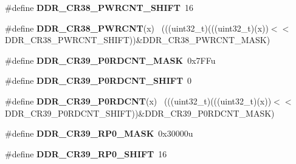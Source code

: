 \begin{DoxyCompactItemize}
\item 
\hypertarget{group___d_d_r___register___masks_gaa8b7e6d2525dfa5b54fd9377efb412c1}{}\#define {\bfseries D\+D\+R\+\_\+\+C\+R38\+\_\+\+P\+W\+R\+C\+N\+T\+\_\+\+S\+H\+I\+F\+T}~16\label{group___d_d_r___register___masks_gaa8b7e6d2525dfa5b54fd9377efb412c1}

\item 
\hypertarget{group___d_d_r___register___masks_ga0090631b8f2aa646557f6fabeb2eecf5}{}\#define {\bfseries D\+D\+R\+\_\+\+C\+R38\+\_\+\+P\+W\+R\+C\+N\+T}(x)                                          ~(((uint32\+\_\+t)(((uint32\+\_\+t)(x))$<$$<$D\+D\+R\+\_\+\+C\+R38\+\_\+\+P\+W\+R\+C\+N\+T\+\_\+\+S\+H\+I\+F\+T))\&D\+D\+R\+\_\+\+C\+R38\+\_\+\+P\+W\+R\+C\+N\+T\+\_\+\+M\+A\+S\+K)\label{group___d_d_r___register___masks_ga0090631b8f2aa646557f6fabeb2eecf5}

\item 
\hypertarget{group___d_d_r___register___masks_gafac099ae641b7d5794ac7bdee022d04b}{}\#define {\bfseries D\+D\+R\+\_\+\+C\+R39\+\_\+\+P0\+R\+D\+C\+N\+T\+\_\+\+M\+A\+S\+K}~0x7\+F\+Fu\label{group___d_d_r___register___masks_gafac099ae641b7d5794ac7bdee022d04b}

\item 
\hypertarget{group___d_d_r___register___masks_ga736cc7367a9b85e7c79c19bc0d9ac75f}{}\#define {\bfseries D\+D\+R\+\_\+\+C\+R39\+\_\+\+P0\+R\+D\+C\+N\+T\+\_\+\+S\+H\+I\+F\+T}~0\label{group___d_d_r___register___masks_ga736cc7367a9b85e7c79c19bc0d9ac75f}

\item 
\hypertarget{group___d_d_r___register___masks_ga7400db390d5cc59311a313ac31f925e8}{}\#define {\bfseries D\+D\+R\+\_\+\+C\+R39\+\_\+\+P0\+R\+D\+C\+N\+T}(x)                                        ~(((uint32\+\_\+t)(((uint32\+\_\+t)(x))$<$$<$D\+D\+R\+\_\+\+C\+R39\+\_\+\+P0\+R\+D\+C\+N\+T\+\_\+\+S\+H\+I\+F\+T))\&D\+D\+R\+\_\+\+C\+R39\+\_\+\+P0\+R\+D\+C\+N\+T\+\_\+\+M\+A\+S\+K)\label{group___d_d_r___register___masks_ga7400db390d5cc59311a313ac31f925e8}

\item 
\hypertarget{group___d_d_r___register___masks_ga6736913071f0b2d64460a9fd5f3b2a43}{}\#define {\bfseries D\+D\+R\+\_\+\+C\+R39\+\_\+\+R\+P0\+\_\+\+M\+A\+S\+K}~0x30000u\label{group___d_d_r___register___masks_ga6736913071f0b2d64460a9fd5f3b2a43}

\item 
\hypertarget{group___d_d_r___register___masks_gac524ea5413073bf87deef32c722374f4}{}\#define {\bfseries D\+D\+R\+\_\+\+C\+R39\+\_\+\+R\+P0\+\_\+\+S\+H\+I\+F\+T}~16\label{group___d_d_r___register___masks_gac524ea5413073bf87deef32c722374f4}


\end{DoxyCompactItemize}
